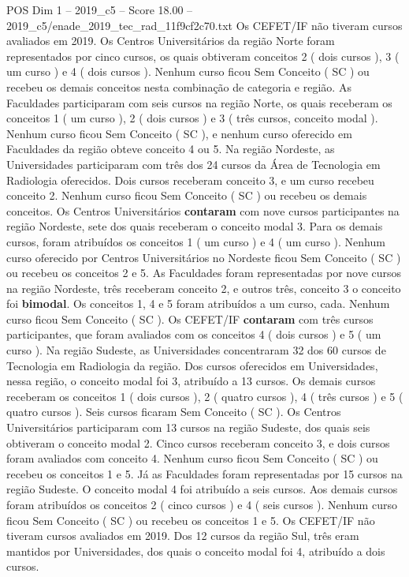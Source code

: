 \begin{textsample}{POS Dim 1 – 2019\_c5 – Score 18.00 – 2019\_c5/enade\_2019\_tec\_rad\_11f9cf2c70.txt}
Os CEFET/IF não tiveram cursos avaliados em 2019.
Os Centros Universitários da região Norte foram representados por cinco cursos, os quais obtiveram conceitos 2 ( dois cursos ), 3 ( um curso ) e 4 ( dois cursos ).
Nenhum curso ficou Sem Conceito ( SC ) ou recebeu os demais conceitos nesta combinação de categoria e região.
As Faculdades participaram com seis cursos na região Norte, os quais receberam os conceitos 1 ( um curso ), 2 ( dois cursos ) e 3 ( três cursos, conceito modal ).
Nenhum curso ficou Sem Conceito ( SC ), e nenhum curso oferecido em Faculdades da região obteve conceito 4 ou 5.
Na região Nordeste, as Universidades participaram com três dos 24 cursos da Área de Tecnologia em Radiologia oferecidos.
Dois cursos receberam conceito 3, e um curso recebeu conceito 2.
Nenhum curso ficou Sem Conceito ( SC ) ou recebeu os demais conceitos.
Os Centros Universitários \textbf{contaram} com nove cursos participantes na região Nordeste, sete dos quais receberam o conceito modal 3.
Para os demais cursos, foram atribuídos os conceitos 1 ( um curso ) e 4 ( um curso ).
Nenhum curso oferecido por Centros Universitários no Nordeste ficou Sem Conceito ( SC ) ou recebeu os conceitos 2 e 5.
As Faculdades foram representadas por nove cursos na região Nordeste, três receberam conceito 2, e outros três, conceito 3 o conceito foi \textbf{bimodal}.
Os conceitos 1, 4 e 5 foram atribuídos a um curso, cada.
Nenhum curso ficou Sem Conceito ( SC ).
Os CEFET/IF \textbf{contaram} com três cursos participantes, que foram avaliados com os conceitos 4 ( dois cursos ) e 5 ( um curso ).
Na região Sudeste, as Universidades concentraram 32 dos 60 cursos de Tecnologia em Radiologia da região.
Dos cursos oferecidos em Universidades, nessa região, o conceito modal foi 3, atribuído a 13 cursos.
Os demais cursos receberam os conceitos 1 ( dois cursos ), 2 ( quatro cursos ), 4 ( três cursos ) e 5 ( quatro cursos ).
Seis cursos ficaram Sem Conceito ( SC ).
Os Centros Universitários participaram com 13 cursos na região Sudeste, dos quais seis obtiveram o conceito modal 2.
Cinco cursos receberam conceito 3, e dois cursos foram avaliados com conceito 4.
Nenhum curso ficou Sem Conceito ( SC ) ou recebeu os conceitos 1 e 5.
Já as Faculdades foram representadas por 15 cursos na região Sudeste.
O conceito modal 4 foi atribuído a seis cursos.
Aos demais cursos foram atribuídos os conceitos 2 ( cinco cursos ) e 4 ( seis cursos ).
Nenhum curso ficou Sem Conceito ( SC ) ou recebeu os conceitos 1 e 5.
Os CEFET/IF não tiveram cursos avaliados em 2019.
Dos 12 cursos da região Sul, três eram mantidos por Universidades, dos quais o conceito modal foi 4, atribuído a dois cursos.

\end{textsample}
